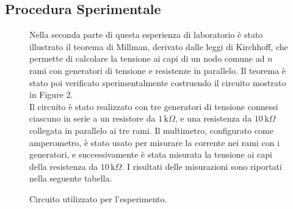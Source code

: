 \subsection{Procedura Sperimentale}
\begin{figure}[h]
\begin{minipage}[t]{0.5\textwidth} %
\vspace{0pt}
    \raggedright %
    Nella seconda parte di questa esperienza di laboratorio è stato illustrato il teorema di Millman, derivato dalle leggi di Kirchhoff, che permette di calcolare la tensione ai capi di un nodo comune ad $n$ rami con generatori di tensione e resistenze in parallelo. Il teorema è stato poi verificato sperimentalmente costruendo il circuito mostrato in Figure 2.\\
    \vspace{0.05\textwidth}
    Il circuito è stato realizzato con tre generatori di tensione connessi ciascuno in serie a un resistore da $1 \, \text{k}\Omega$, e una resistenza da $10 \, \text{k}\Omega$ collegata in parallelo ai tre rami. Il multimetro, configurato come amperometro, è stato usato per misurare la corrente nei rami con i generatori, e successivamente è stata misurata la tensione ai capi della resistenza da $10 \, \text{k}\Omega$. I risultati delle misurazioni sono riportati nella seguente tabella.
\end{minipage}%
\hspace{0.05\textwidth} %
\begin{minipage}[t]{0.4\textwidth} %
\vspace{0pt}
    \centering
    \caption{Circuito utilizzato per l'esperimento.}
    \label{fig:circuito}
\end{minipage}
\end{figure}


